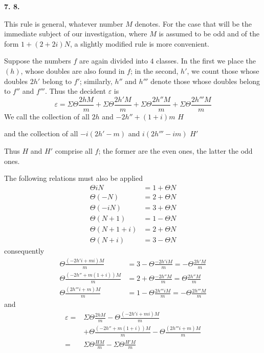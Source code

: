 \par\medskip{}\centerline{\textbf{7. 8.}}\nobreak\smallskip
This rule is general, whatever number $M$ denotes. For the case that will be the immediate subject of our investigation, where $M$ is assumed to be odd and of the form $1+(2+2i)N$, a slightly modified rule is more convenient.

Suppose the numbers $f$ are again divided into $4$ classes. In the first we place the $(h)$, whose doubles are also found in $f$; in the second, $h'$, we count those whose doubles $2h'$ belong to $f'$; similarly, $h''$ and $h'''$ denote those whose doubles belong to $f''$ and $f'''$. Thus the decident $\varepsilon$ is
\[
\varepsilon=\Sigma\Theta\frac{2hM}{m}+\Sigma\Theta\frac{2h'M}{m}+\Sigma\Theta\frac{2h''M}{m}+\Sigma\Theta\frac{2h'''M}{m}
\]
We call the collection of all $2h$ and $-2h''+(1+i)m$ $H$

and the collection of all $-i(2h'-m)$ and $i(2h'''-im)$ $H'$

Thus $H$ and $H'$ comprise all $f$; the former are the even ones, the latter the odd ones.

The following relations must also be applied
\[
\begin{aligned}
\Theta iN&=1+\Theta N\\
\Theta(-N)&=2+\Theta N\\
\Theta(-iN)&=3+\Theta N\\
\Theta(N+1)&=1-\Theta N\\
\Theta(N+1+i)&=2+\Theta N\\
\Theta(N+i)&=3-\Theta N
\end{aligned}
\]
consequently
\[
\begin{aligned}
\Theta\frac{(-2h'i+mi)M}{m}&=3-\Theta\frac{-2h'iM}{m}=-\Theta\frac{2h'M}{m}\\
\Theta\frac{(-2h''+m(1+i))M}{m}&=2+\Theta\frac{-2h''M}{m}=\Theta\frac{2h''M}{m}\\
\Theta\frac{(2h'''i+m)M}{m}&=1-\Theta\frac{2h'''iM}{m}=-\Theta\frac{2h'''M}{m}
\end{aligned}
\]
and
\[
\begin{aligned}
\varepsilon={}&\Sigma\Theta\frac{2hM}{m}-\Theta\frac{(-2h'i+mi)M}{m}\\
&+\Theta\frac{(-2h''+m(1+i))M}{m}-\Theta\frac{(2h'''i+m)M}{m}\\
={}&\Sigma\Theta\frac{HM}{m}-\Sigma\Theta\frac{H'M}{m}
\end{aligned}
\]

